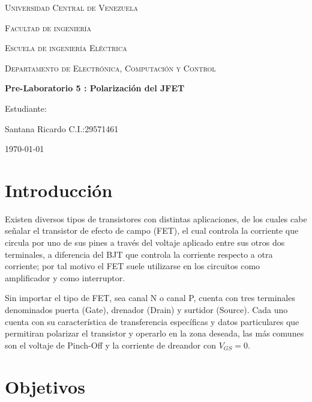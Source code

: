 \documentclass[12pt, a4paper]{article}
\begin{document}
    \begin{titlepage}
        \centering
        {\scshape\Large Universidad Central de Venezuela \par}
        {\scshape\Large Facultad de ingeniería \par}
        {\scshape\Large Escuela de ingeniería Eléctrica \par}
        {\scshape\Large Departamento de Electrónica, Computación y Control \par}

        \vspace{6cm}
        {\Large\bfseries Pre-Laboratorio 5 : Polarización del JFET\par}
        \vspace{6cm}

        \vfill
        \begin{flushright}
            Estudiante:\par
            Santana Ricardo C.I.:29571461 \par
            \vspace{1cm}  
        \end{flushright}
        \vfill
        {\large \today \par}
    \end{titlepage}

    \section{Introducción}

    Existen diversos tipos de transistores con distintas aplicaciones, de los cuales cabe señalar el transistor de efecto de campo (FET), el cual controla la corriente que circula por uno de sus pines a través del voltaje aplicado entre sus otros dos terminales, a diferencia del BJT que controla la corriente respecto a otra corriente; por tal motivo el FET suele utilizarse en los circuitos como amplificador y como interruptor.

    Sin importar el tipo de FET, sea canal N o canal P, cuenta con tres terminales denominados puerta (Gate), drenador (Drain) y surtidor (Source). Cada uno cuenta con su característica de transferencia específicas y datos particulares que permitiran polarizar el transistor y operarlo en la zona deseada, las más comunes son el voltaje de Pinch-Off y la corriente de dreandor con $V_{GS} = 0$. 

    \newpage

    \section{Objetivos}
\end{document}
